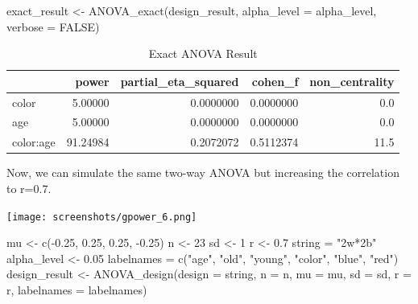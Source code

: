 \documentclass[
]{book}
\newenvironment{Shaded}{\begin{snugshade}}{\end{snugshade}}
\newcommand{\AttributeTok}[1]{\textcolor[rgb]{0.77,0.63,0.00}{#1}}
\newcommand{\ConstantTok}[1]{\textcolor[rgb]{0.00,0.00,0.00}{#1}}
\newcommand{\DecValTok}[1]{\textcolor[rgb]{0.00,0.00,0.81}{#1}}
\newcommand{\FloatTok}[1]{\textcolor[rgb]{0.00,0.00,0.81}{#1}}
\newcommand{\FunctionTok}[1]{\textcolor[rgb]{0.00,0.00,0.00}{#1}}
\newcommand{\NormalTok}[1]{#1}
\newcommand{\OtherTok}[1]{\textcolor[rgb]{0.56,0.35,0.01}{#1}}
\newcommand{\SpecialCharTok}[1]{\textcolor[rgb]{0.00,0.00,0.00}{#1}}
\newcommand{\StringTok}[1]{\textcolor[rgb]{0.31,0.60,0.02}{#1}}
\begin{document}
\begin{Shaded}
\begin{Highlighting}[]
\NormalTok{exact\_result }\OtherTok{\textless{}{-}} \FunctionTok{ANOVA\_exact}\NormalTok{(design\_result,}
                            \AttributeTok{alpha\_level =}\NormalTok{ alpha\_level,}
                            \AttributeTok{verbose =} \ConstantTok{FALSE}\NormalTok{)}
\end{Highlighting}
\end{Shaded}

\begin{table}[!h]

\caption{\label{tab:unnamed-chunk-154}Exact ANOVA Result}
\centering
\begin{tabular}[t]{l|r|r|r|r}
\hline
  & power & partial\_eta\_squared & cohen\_f & non\_centrality\\
\hline
color & 5.00000 & 0.0000000 & 0.0000000 & 0.0\\
\hline
age & 5.00000 & 0.0000000 & 0.0000000 & 0.0\\
\hline
color:age & 91.24984 & 0.2072072 & 0.5112374 & 11.5\\
\hline
\end{tabular}
\end{table}

\newpage

Now, we can simulate the same two-way ANOVA but increasing the correlation to r=0.7.

\texttt{[image: screenshots/gpower\_6.png]}
\newpage

\begin{Shaded}
\begin{Highlighting}[]
\NormalTok{mu }\OtherTok{\textless{}{-}} \FunctionTok{c}\NormalTok{(}\SpecialCharTok{{-}}\FloatTok{0.25}\NormalTok{, }\FloatTok{0.25}\NormalTok{, }\FloatTok{0.25}\NormalTok{, }\SpecialCharTok{{-}}\FloatTok{0.25}\NormalTok{)}
\NormalTok{n }\OtherTok{\textless{}{-}} \DecValTok{23}
\NormalTok{sd }\OtherTok{\textless{}{-}} \DecValTok{1}
\NormalTok{r }\OtherTok{\textless{}{-}} \FloatTok{0.7}
\NormalTok{string }\OtherTok{=} \StringTok{"2w*2b"}
\NormalTok{alpha\_level }\OtherTok{\textless{}{-}} \FloatTok{0.05}
\NormalTok{labelnames }\OtherTok{=} \FunctionTok{c}\NormalTok{(}\StringTok{"age"}\NormalTok{, }\StringTok{"old"}\NormalTok{, }\StringTok{"young"}\NormalTok{, }\StringTok{"color"}\NormalTok{, }\StringTok{"blue"}\NormalTok{, }\StringTok{"red"}\NormalTok{)}
\NormalTok{design\_result }\OtherTok{\textless{}{-}} \FunctionTok{ANOVA\_design}\NormalTok{(}\AttributeTok{design =}\NormalTok{ string,}
                              \AttributeTok{n =}\NormalTok{ n, }
                              \AttributeTok{mu =}\NormalTok{ mu, }
                              \AttributeTok{sd =}\NormalTok{ sd, }
                              \AttributeTok{r =}\NormalTok{ r, }
                              \AttributeTok{labelnames =}\NormalTok{ labelnames)}
\end{Highlighting}
\end{Shaded}
\end{document}
